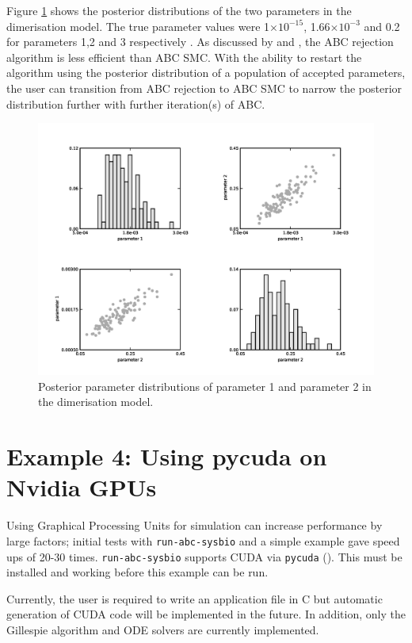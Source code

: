\documentclass[a4paper]{report}
\begin{document}
Figure \ref{DimerisationResults} shows the posterior distributions of the two parameters in the dimerisation model. The true parameter values were 1$\times 10^{-15}$, 1.66$\times 10^{-3}$ and 0.2 for parameters 1,2 and 3 respectively . As discussed by \cite{Toni2009} and \cite{Sisson2007}, the ABC rejection algorithm is less efficient than ABC SMC. With the ability to restart the algorithm using the posterior distribution of a population of accepted parameters, the user can transition from ABC rejection to ABC SMC to narrow the posterior distribution further with further iteration(s) of ABC.
\begin{figure}[htbp]
\begin{center}
\includegraphics[width=1.0\textwidth]{Graphics/DimerisationResults.png}
\caption{Posterior parameter distributions of parameter 1 and parameter 2 in the dimerisation model. \label{DimerisationResults}}
\end{center}
\end{figure}

\section{Example 4: Using pycuda on Nvidia GPUs}
Using Graphical Processing Units for simulation can increase performance by large factors; initial tests with \verb$run-abc-sysbio$ and a simple example gave speed ups of 20-30 times. \verb$run-abc-sysbio$ supports CUDA via \verb$pycuda$ (\cite{Klockner2009}). This must be installed and working before this example can be run. 

Currently, the user is required to write an application file in C but automatic generation of CUDA code will be implemented in the future. In addition, only the Gillespie algorithm and ODE solvers are currently implemented.
\end{document}
